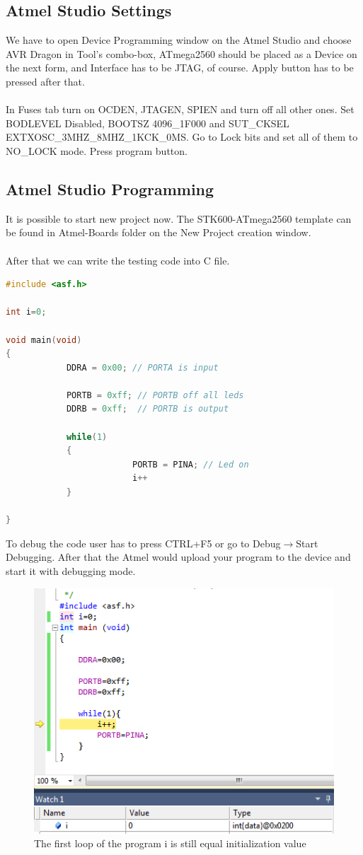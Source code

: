 \documentclass[english]{article}
\begin{document}
\subsection{Atmel Studio Settings}
We have to open Device Programming window on the Atmel Studio and choose AVR Dragon in Tool's combo-box, ATmega2560 should be placed as a Device on the next form, and Interface has to be JTAG, of course. Apply button has to be pressed after that.\\\\
In Fuses tab turn on OCDEN, JTAGEN, SPIEN and turn off all other ones. Set BODLEVEL Disabled, BOOTSZ 4096\_1F000 and SUT\_CKSEL EXTXOSC\_3MHZ\_8MHZ\_1KCK\_0MS. Go to Lock bits and set all of them to NO\_LOCK mode. Press program button.
\subsection{Atmel Studio Programming}
It is possible to start new project now. The STK600-ATmega2560 template can be found in Atmel-Boards folder on the New Project creation window.\\\\
After that we can write the testing code into C file.
\begin{lstlisting}[language=C]
 #include <asf.h>

int i=0;

void main(void)
{            
            DDRA = 0x00; // PORTA is input
                    
            PORTB = 0xff; // PORTB off all leds
            DDRB = 0xff;  // PORTB is output
        
            while(1)
            {
                         PORTB = PINA; // Led on
                         i++
            }

}
\end{lstlisting}
To debug the code user has to press CTRL+F5 or go to Debug$\rightarrow$Start Debugging. After that the Atmel would upload your program to the device and start it with debugging mode.
\begin{figure}[H]
\centerline{\includegraphics[scale=0.8]{MicroLab3/i_0}}
\caption{The first loop of the program i is still equal initialization value}
\end{figure}
\end{document}
